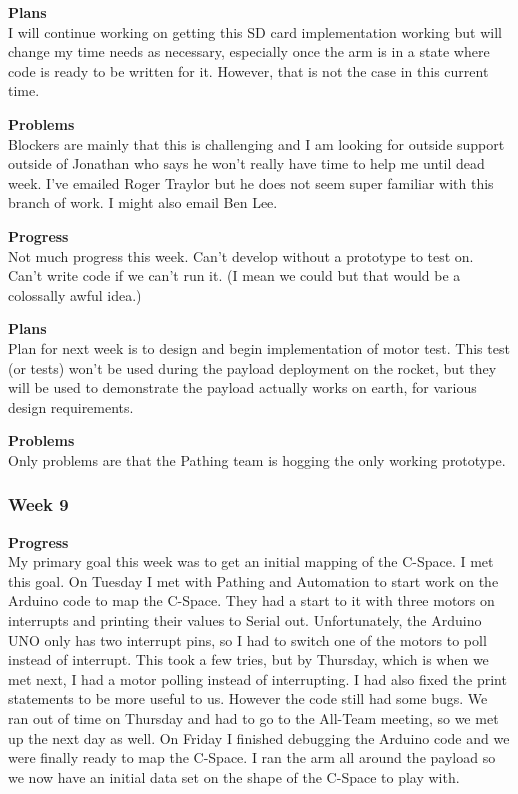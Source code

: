 \textbf{Plans} \\ 
I will continue working on getting this SD card implementation working but will change my time needs as necessary, especially once the arm is in a state 
where code is ready to be written for it. However, that is not the case in this current time.


\textbf{Problems} \\ 
Blockers are mainly that this is challenging and I am looking for outside support outside of Jonathan who says he won't really have time to help me until 
dead week. I've emailed Roger Traylor but he does not seem super familiar with this branch of work. I might also email Ben Lee.

\textbf{Progress} \\
Not much progress this week. Can't develop without a prototype to test on. 
Can't write code if we can't run it. (I mean we could but that would be a 
colossally awful idea.)

\textbf{Plans} \\
Plan for next week is to design and begin implementation of motor test. This 
test (or tests) won't be used during the payload deployment on the rocket, but 
they will be used to demonstrate the payload actually works on earth, for 
various design requirements.

\textbf{Problems} \\
Only problems are that the Pathing team is hogging the only working prototype.

\subsubsection{Week 9}
\textbf{Progress} \\ 
My primary goal this week was to get an initial mapping of the C-Space. I met this goal. On Tuesday I met with Pathing and Automation to start work on the Arduino code to map the C-Space. They had a start to it with three motors on interrupts and printing their values to Serial out. Unfortunately, the Arduino UNO only has two interrupt pins, so I had to switch one of the motors to poll instead of interrupt. This took a few tries, but by Thursday, which is when we met next, I had a motor polling instead of interrupting. I had also fixed the print statements to be more useful to us. However the code still had some bugs. We ran out of time on Thursday and had to go to the All-Team meeting, so we met up the next day as well. On Friday I finished debugging the Arduino code and we were finally ready to map the C-Space. I ran the arm all around the payload so we now have an initial data set on the shape of the C-Space to play with.

